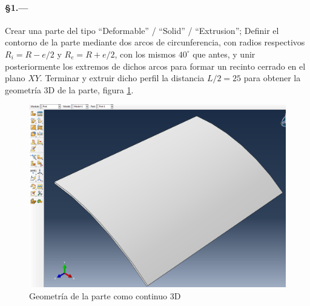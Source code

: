 \documentclass[spanish,a4paper,12pt]{article}
\begin{document}
\paragraph{\S1.---}
Crear una parte del tipo ``Deformable'' / ``Solid'' / ``Extrusion'';
Definir el contorno de la parte mediante dos arcos de circunferencia, con radios respectivos $R_{i}=R-e/2$ y $R_{e}=R+e/2$, con los mismos $40^{\circ}$ que antes, y unir posteriormente los extremos de dichos arcos para formar un recinto cerrado en el plano $XY$.
Terminar y extruir dicho perfil la distancia $L/2=25$ para obtener la geometría 3D de la parte, figura \ref{fig:part-solid}.
\begin{figure}[h!tp]
\centering
\includegraphics[scale=0.3]{capturas/40-part-solid.png}
\caption{Geometría de la parte como continuo 3D}
\label{fig:part-solid}
\end{figure}
\end{document}

